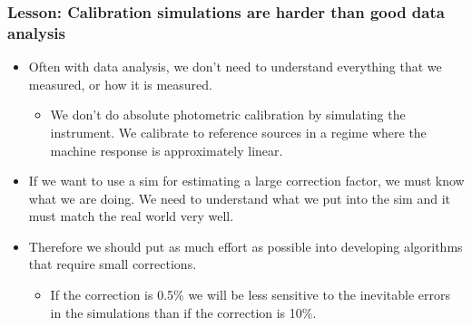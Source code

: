 \documentclass{beamer}
\begin{document}
\frame
{

    \frametitle{Lesson: Calibration simulations are harder than good data analysis}


    \begin{itemize}

        \item Often with data analysis, we don't need to understand everything that
            we measured, or how it is measured.

            \begin{itemize}

                \item We don't do absolute photometric calibration by
                    simulating the instrument.  We calibrate to reference
                    sources in a regime where the machine response is
                    approximately linear.

            \end{itemize}

        \item If we want to use a sim for estimating a large correction factor,
            we must know what we are doing. We need to understand what we put
            into the sim and it must match the real world very well.

        \item Therefore we should put as much effort as possible into developing
            algorithms that require small corrections.

            \begin{itemize}
    
                \item If the correction is 0.5\% we will be less sensitive to the
                    inevitable errors in the simulations than if the correction is 10\%.

            \end{itemize}

    \end{itemize}

}
\end{document}
